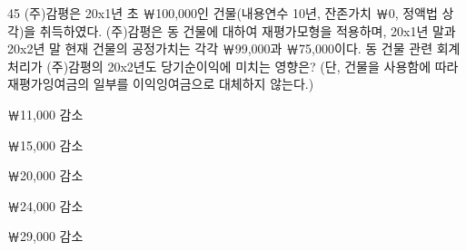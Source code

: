 \begin{question}{45}
(주)감평은 20x1년 초 ￦100,000인 건물(내용연수 10년, 잔존가치 ￦0, 정액법 상각)을 취득하였다. (주)감평은 동 건물에 대하여 재평가모형을 적용하며, 20x1년 말과 20x2년 말 현재 건물의 공정가치는 각각 ￦99,000과 ￦75,000이다. 동 건물 관련 회계처리가 (주)감평의 20x2년도 당기순이익에 미치는 영향은? (단, 건물을 사용함에 따라 재평가잉여금의 일부를 이익잉여금으로 대체하지 않는다.)
\begin{choices}
  \item ￦11,000 감소
  \item ￦15,000 감소
  \item ￦20,000 감소
  \item ￦24,000 감소
  \item ￦29,000 감소
\end{choices}
\end{question}
